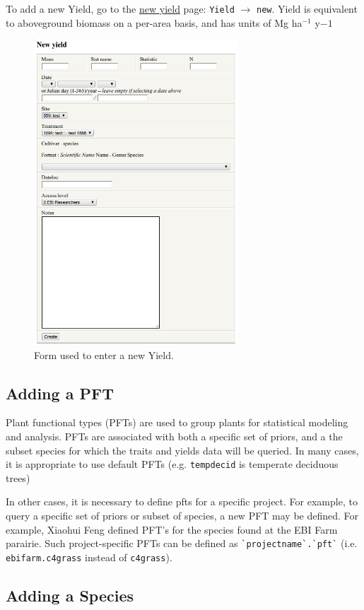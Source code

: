 \documentclass[12pt,english,portrait]{article}
\begin{document}
 To add a new Yield, go to the \href{http:ebi-forecast.igb.uiuc.edu/bety/yields/new}{new yield} page: \verb+Yield+ $\to$ \verb+new+.
 Yield is equivalent to aboveground biomass on a per-area basis, and has units of Mg ha$^{-1}$ y${-1}$

\begin{figure}
\includegraphics[width=3in]{figures/yields_new.png} 
\caption{Form used to enter a new Yield.}
\label{fig:yields_new}
\end{figure}

\subsection{Adding a PFT}
Plant functional types (PFTs) are used to group plants for statistical modeling and analysis.
PFTs are associated with both a specific set of priors, and a the subset species for which the traits and yields data will be queried.
In many cases, it is appropriate to use default PFTs (e.g. \verb+tempdecid+ is temperate deciduous trees)

In other cases, it is necessary to define pfts for a specific project.
For example, to query a specific set of priors or subset of species, a new PFT may be defined. 
For example, Xiaohui Feng defined PFT's for the species found at the EBI Farm parairie.
Such project-specific PFTs can be defined as \verb+`projectname`.`pft`+ (i.e. \verb+ebifarm.c4grass+ instead of \verb+c4grass+).

\subsection{Adding a Species} \label{sec:addspecies}
\end{document}
